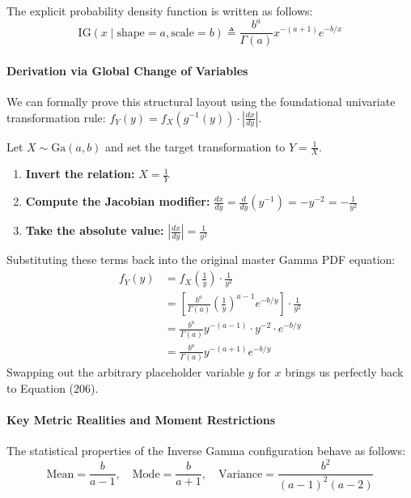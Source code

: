\documentclass{article}
\begin{document}
The explicit probability density function is written as follows:
\begin{equation}
\text{IG}(x \mid \text{shape} = a, \text{scale} = b) \triangleq \frac{b^a}{\Gamma(a)} x^{-(a+1)} e^{-b/x} \tag{206}
\end{equation}

\paragraph{Derivation via Global Change of Variables}
We can formally prove this structural layout using the foundational univariate transformation rule: $f_Y(y) = f_X(g^{-1}(y)) \cdot \left| \frac{dx}{dy} \right|$.

Let $X \sim \text{Ga}(a, b)$ and set the target transformation to $Y = \frac{1}{X}$.
\begin{enumerate}
    \item \textbf{Invert the relation:} $X = \frac{1}{Y}$
    \item \textbf{Compute the Jacobian modifier:} $\frac{dx}{dy} = \frac{d}{dy}\left(y^{-1}\right) = -y^{-2} = -\frac{1}{y^2}$
    \item \textbf{Take the absolute value:} $\left| \frac{dx}{dy} \right| = \frac{1}{y^2}$
\end{enumerate}
Substituting these terms back into the original master Gamma PDF equation:
\begin{align*}
f_Y(y) &= f_X\left(\frac{1}{y}\right) \cdot \frac{1}{y^2} \\
&= \left[ \frac{b^a}{\Gamma(a)} \left(\frac{1}{y}\right)^{a-1} e^{-b/y} \right] \cdot \frac{1}{y^2} \\
&= \frac{b^a}{\Gamma(a)} y^{-(a-1)} \cdot y^{-2} \cdot e^{-b/y} \\
&= \frac{b^a}{\Gamma(a)} y^{-(a+1)} e^{-b/y}
\end{align*}
Swapping out the arbitrary placeholder variable $y$ for $x$ brings us perfectly back to Equation (206).

\paragraph{Key Metric Realities and Moment Restrictions}
The statistical properties of the Inverse Gamma configuration behave as follows:
\begin{equation}
\text{Mean} = \frac{b}{a - 1}, \quad \text{Mode} = \frac{b}{a + 1}, \quad \text{Variance} = \frac{b^2}{(a - 1)^2(a - 2)} \tag{207}
\end{equation}
\end{document}
